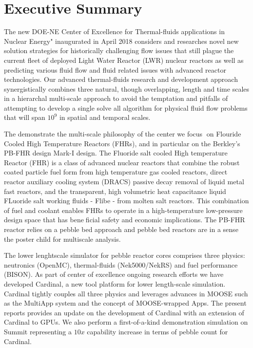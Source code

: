 
\section*{Executive Summary}

The new DOE-NE Center of Excellence for Thermal-fluids applications in Nuclear Energy" inaugurated in
April 2018 considers and researches novel new solution strategies for historically challenging
flow issues that still plague the current  fleet of deployed Light Water Reactor (LWR) nuclear reactors as well as predicting various fluid flow and  fluid related issues with advanced reactor technologies. Our advanced thermal-fluids research and development approach synergistically combines three natural, though overlapping, length and time scales in a hierarchal multi-scale approach to avoid the temptation and pitfalls of attempting to develop a single solve all algorithm for physical  fluid flow problems that will span $10^9$ in spatial and temporal scales.

The demonstrate the multi-scale philosophy of the center we focus on Flouride Cooled High
Temperature Reactors (FHRs), and in particular on the Berkley's PB-FHR design Mark-I design. The
Fluoride salt cooled High temperature Reactor (FHR) is a class of advanced nuclear reactors that combine the
robust coated particle fuel form from high temperature gas cooled reactors, direct reactor auxiliary cooling
system (DRACS) passive decay removal of liquid metal fast reactors, and the transparent, high volumetric heat capacitance liquid FLuoride salt working fluids - Flibe - from molten salt reactors. This combination of fuel and coolant enables FHRs to operate in a high-temperature low-pressure design space that has beneficial safety and economic implications. The PB-FHR reactor relies on a pebble bed approach and pebble bed reactors are in a sense the poster child for multiscale analysis.

The lower lenghtscale simulator for pebble reactor cores comprises three physics: neutronics (OpenMC),
thermal-fluids (Nek5000/NekRS) and fuel performance (BISON). As part of center of excellence ongoing research efforts we have developed Cardinal, a new tool platform for lower length-scale simulation. Cardinal tightly couples all three physics and leverages advances in MOOSE such as the MultiApp system and the concept of MOOSE-wrapped Apps. The present reports provides an update on the development of Cardinal with an extension of Cardinal to GPUs. We also perform a first-of-a-kind demonstration simulation on Summit representing a $10x$ capability increase in terms of pebble count for Cardinal.
